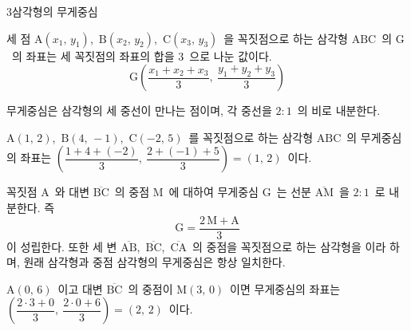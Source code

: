 \documentclass[10pt]{article}
\begin{document}
\begin{dmconcept}{3}{삼각형의 무게중심}
\setlength{\parskip}{2.0mm plus 2.1mm minus 0mm}\linespread{1.30}\selectfont%


세 점 $\mathrm{A}(x_1,\, y_1)$,\ $\mathrm{B}(x_2,\, y_2)$,\ $\mathrm{C}(x_3,\, y_3)$\ 을 꼭짓점으로 하는 삼각형 $\mathrm{ABC}$\ 의  $\mathrm{G}$\ 의 좌표는 세 꼭짓점의 좌표의 합을 $3$\ 으로 나눈 값이다.
\begin{equation*}
  \mathrm{G}\!\left( \frac{x_1 + x_2 + x_3}{3},\ \frac{y_1 + y_2 + y_3}{3} \right)
\end{equation*}

무게중심은 삼각형의 세 중선이 만나는 점이며, 각 중선을 $2 : 1$\ 의 비로 내분한다.

\begin{dmexample}
$\mathrm{A}(1,\, 2)$,\ $\mathrm{B}(4,\, -1)$,\ $\mathrm{C}(-2,\, 5)$\ 를 꼭짓점으로 하는 삼각형 $\mathrm{ABC}$\ 의 무게중심의 좌표는 $\left( \dfrac{1 + 4 + (-2)}{3},\ \dfrac{2 + (-1) + 5}{3} \right) = (1,\, 2)$\ 이다.
\end{dmexample}


꼭짓점 $\mathrm{A}$\ 와 대변 $\overline{\mathrm{BC}}$\ 의 중점 $\mathrm{M}$\ 에 대하여 무게중심 $\mathrm{G}$\ 는 선분 $\overline{\mathrm{AM}}$\ 을 $2 : 1$\ 로 내분한다. 즉
\begin{equation*}
  \mathrm{G} = \frac{2\,\mathrm{M} + \mathrm{A}}{3}
\end{equation*}
이 성립한다. 또한 세 변 $\overline{\mathrm{AB}}$,\ $\overline{\mathrm{BC}}$,\ $\overline{\mathrm{CA}}$\ 의 중점을 꼭짓점으로 하는 삼각형을 이라 하며, 원래 삼각형과 중점 삼각형의 무게중심은 항상 일치한다.

\begin{dmexample}
$\mathrm{A}(0,\, 6)$\ 이고 대변 $\overline{\mathrm{BC}}$\ 의 중점이 $\mathrm{M}(3,\, 0)$\ 이면 무게중심의 좌표는 $\left( \dfrac{2 \cdot 3 + 0}{3},\ \dfrac{2 \cdot 0 + 6}{3} \right) = (2,\, 2)$\ 이다.
\end{dmexample}

\end{dmconcept}

\newpage

\end{document}
